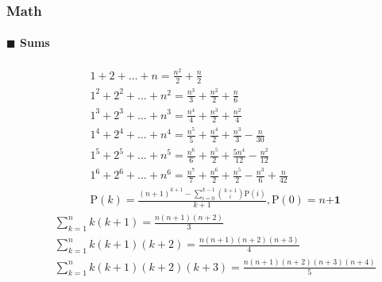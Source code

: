 \documentclass[10pt]{article}
\begin{document}
{\subsubsection{Math}
\paragraph{$\blacksquare$ Sums}
\begin{eqnarray*}
&& 1+2+\ldots +n=\frac{n^2}{2}+\frac{n}{2} \\
&& 1^2+2^2+\ldots +n^2=\frac{n^3}{3}+\frac{n^2}{2}+\frac{n}{6} \\
&& 1^3+2^3+\ldots +n^3=\frac{n^4}{4}+\frac{n^3}{2}+\frac{n^2}{4} \\
&& 1^4+2^4+\ldots +n^4=\frac{n^5}{5}+\frac{n^4}{2}+\frac{n^3}{3}-\frac{n}{30} \\
&& 1^5+2^5+\ldots +n^5=\frac{n^6}{6}+\frac{n^5}{2}+\frac{5n^4}{12}-\frac{n^2}{12} \\
&& 1^6+2^6+\ldots +n^6=\frac{n^7}{7}+\frac{n^6}{2}+\frac{n^5}{2}-\frac{n^3}{6}+\frac{n}{42} \\
&& \mathrm{P}(k)=\frac{(n+1)^{k+1}-\sum_{i=0}^{k-1}\binom{k+1}{i}\mathrm{P}(i)}{k+1}, \mathrm{P}(0)=n\textbf{+1}
\end{eqnarray*}
\begin{eqnarray*}
&& \sum_{k=1}^{n}k(k+1)=\frac{n(n+1)(n+2)}{3} \\
&& \sum_{k=1}^{n}k(k+1)(k+2)=\frac{n(n+1)(n+2)(n+3)}{4} \\
&& \sum_{k=1}^{n}k(k+1)(k+2)(k+3)=\frac{n(n+1)(n+2)(n+3)(n+4)}{5}
\end{eqnarray*}
}
\end{document}

